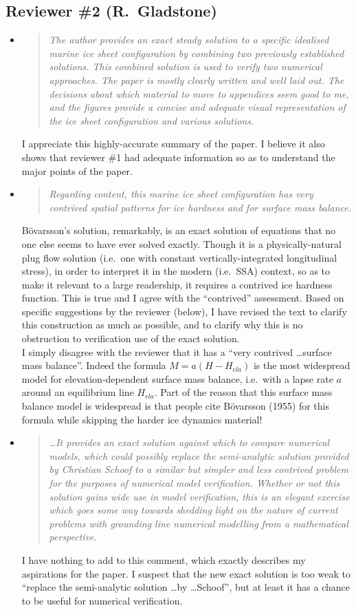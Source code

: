 \documentclass[11pt,reqno]{amsart}
\renewcommand{\dh}{\fontencoding{T1}\selectfont{\symbol{240}}}
\newcommand{\bod}{B\"o\dh varsson\xspace}
\newcommand{\citebod}{B\"o\dh varsson (1955)\nocite{Bodvardsson}\xspace}
\newcommand{\reply}[2]{
\medskip\medskip
\item  \begin{quote}
\emph{#1}
\end{quote}

\medskip
\noindent #2}
\begin{document}
\subsection*{Reviewer \#2 (R.~Gladstone)}  \begin{itemize}
\reply{The author provides an exact steady solution to a specific idealised marine ice sheet configuration by combining two previously established solutions. This combined solution is used to verify two numerical approaches. The paper is mostly clearly written and well laid out. The decisions about which material to move to appendices seem good to me, and the figures provide a concise and adequate visual representation of the ice sheet configuration and various solutions.}
{I appreciate this highly-accurate summary of the paper.  I believe it also shows that reviewer \#1 had adequate information so as to understand the major points of the paper.}

\reply{Regarding content, this marine ice sheet configuration has very contrived spatial patterns for ice hardness and for surface mass balance.}
{\bod's solution, remarkably, is an exact solution of equations that no one else seems to have ever solved exactly.  Though it is a physically-natural plug flow solution (i.e.~one with constant vertically-integrated longitudinal stress), in order to interpret it in the modern (i.e.~SSA) context, so as to make it relevant to a large readership, it requires a contrived ice hardness function.  This is true and I agree with the ``contrived'' assessment.  Based on specific suggestions by the reviewer (below), I have revised the text to clarify this construction as much as possible, and to clarify why this is no obstruction to verification use of the exact solution. \medskip \\
I simply disagree with the reviewer that it has a ``very contrived \dots surface mass balance''.  Indeed the formula $M=a(H-H_{ela})$ is the most widespread model for elevation-dependent surface mass balance, i.e.~with a lapse rate $a$ around an equilibrium line $H_{ela}$.  Part of the reason that this surface mass balance model is widespread is that people cite \citebod for this formula while skipping the harder ice dynamics material!}

\reply{\dots It provides an exact solution against which to compare numerical models, which could possibly replace the semi-analytic solution provided by Christian Schoof to a similar but simpler and less contrived problem for the purposes of numerical model verification.  Whether or not this solution gains wide use in model verification, this is an elegant exercise which goes some way towards shedding light on the nature of current problems with grounding line numerical modelling from a mathematical perspective.}
{I have nothing to add to this comment, which exactly describes my aspirations for the paper.  I suspect that the new exact solution is too weak to ``replace the semi-analytic solution \dots by \dots Schoof'', but at least it has a chance to be useful for numerical verification.}


\end{itemize}
\end{document}
